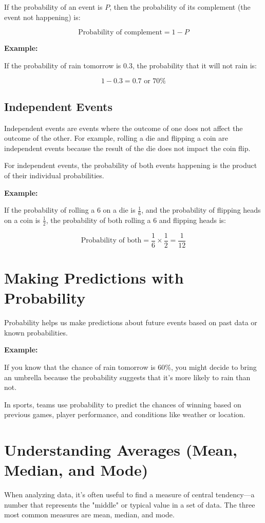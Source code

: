 If the probability of an event is $P$, then the probability of its complement (the event not happening) is:

\[
\text{Probability of complement} = 1 - P
\]

\textbf{Example:}

If the probability of rain tomorrow is 0.3, the probability that it will not rain is:

\[
1 - 0.3 = 0.7 \text{ or } 70\%
\]

\subsection{Independent Events}
Independent events are events where the outcome of one does not affect the outcome of the other. For example, rolling a die and flipping a coin are independent events because the result of the die does not impact the coin flip.

For independent events, the probability of both events happening is the product of their individual probabilities.

\textbf{Example:}

If the probability of rolling a 6 on a die is $\frac{1}{6}$, and the probability of flipping heads on a coin is $\frac{1}{2}$, the probability of both rolling a 6 and flipping heads is:

\[
\text{Probability of both} = \frac{1}{6} \times \frac{1}{2} = \frac{1}{12}
\]

\section{Making Predictions with Probability}
Probability helps us make predictions about future events based on past data or known probabilities.

\textbf{Example:}

If you know that the chance of rain tomorrow is 60\%, you might decide to bring an umbrella because the probability suggests that it’s more likely to rain than not.

In sports, teams use probability to predict the chances of winning based on previous games, player performance, and conditions like weather or location.

\section{Understanding Averages (Mean, Median, and Mode)}
When analyzing data, it’s often useful to find a measure of central tendency—a number that represents the "middle" or typical value in a set of data. The three most common measures are mean, median, and mode.

